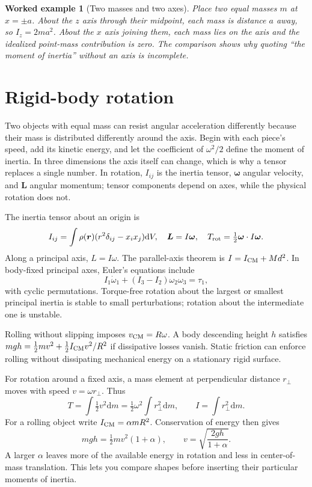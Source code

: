 \documentclass[11pt,oneside]{book}
\newcommand{\dd}{\mathrm{d}}
\newcommand{\vect}[1]{\boldsymbol{#1}}
\theoremstyle{reviewstyle}
\newtheorem{example}{Worked example}[chapter]
\begin{document}
\begin{example}[Two masses and two axes]
Place two equal masses $m$ at $x=\pm a$. About the $z$ axis through their midpoint, each mass is distance $a$ away, so $I_z=2ma^2$. About the $x$ axis joining them, each mass lies on the axis and the idealized point-mass contribution is zero. The comparison shows why quoting ``the moment of inertia'' without an axis is incomplete.
\end{example}

\section{Rigid-body rotation}
Two objects with equal mass can resist angular acceleration differently because their mass is distributed differently around the axis. Begin with each piece's speed, add its kinetic energy, and let the coefficient of $\omega^2/2$ define the moment of inertia. In three dimensions the axis itself can change, which is why a tensor replaces a single number. In rotation, $I_{ij}$ is the inertia tensor, $\vect\omega$ angular velocity, and $\vect L$ angular momentum; tensor components depend on axes, while the physical rotation does not.

The inertia tensor about an origin is
\begin{equation}
I_{ij}=\int\rho(\vect r)(r^2\delta_{ij}-x_ix_j)\dd V,
\quad \vect L=I\vect\omega,\quad T_{\rm rot}=\tfrac12\vect\omega\cdot I\vect\omega.
\end{equation}
Along a principal axis, $L=I\omega$. The parallel-axis theorem is $I=I_{\rm CM}+Md^2$. In body-fixed principal axes, Euler's equations include
\begin{equation}
I_1\dot\omega_1+(I_3-I_2)\omega_2\omega_3=\tau_1,
\end{equation}
with cyclic permutations. Torque-free rotation about the largest or smallest principal inertia is stable to small perturbations; rotation about the intermediate one is unstable.

Rolling without slipping imposes $v_{\rm CM}=R\omega$. A body descending height $h$ satisfies
$mgh=\tfrac12mv^2+\tfrac12I_{\rm CM}v^2/R^2$ if dissipative losses vanish. Static friction can enforce rolling without dissipating mechanical energy on a stationary rigid surface.

For rotation around a fixed axis, a mass element at perpendicular distance $r_\perp$ moves with speed $v=\omega r_\perp$. Thus
\begin{equation}
T=\int\tfrac12v^2\dd m=\tfrac12\omega^2\int r_\perp^2\dd m,
\qquad I=\int r_\perp^2\dd m.
\end{equation}
For a rolling object write $I_{\rm CM}=\alpha mR^2$. Conservation of energy then gives
\begin{equation}
mgh=\tfrac12mv^2(1+\alpha),\qquad
v=\sqrt{\frac{2gh}{1+\alpha}}.
\end{equation}
A larger $\alpha$ leaves more of the available energy in rotation and less in center-of-mass translation. This lets you compare shapes before inserting their particular moments of inertia.
\end{document}
